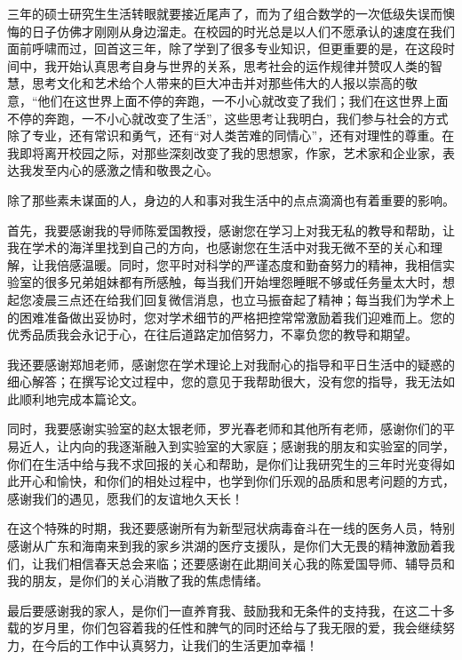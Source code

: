 
\thesisacknowledgement

三年的硕士研究生生活转眼就要接近尾声了，而为了组合数学的一次低级失误而懊悔的日子仿佛才刚刚从身边溜走。在校园的时光总是以人们不愿承认的速度在我们面前呼啸而过，回首这三年，除了学到了很多专业知识，但更重要的是，在这段时间中，我开始认真思考自身与世界的关系，思考社会的运作规律并赞叹人类的智慧，思考文化和艺术给个人带来的巨大冲击并对那些伟大的人报以崇高的敬意，“他们在这世界上面不停的奔跑，一不小心就改变了我们；我们在这世界上面不停的奔跑，一不小心就改变了生活”，这些思考让我明白，我们参与社会的方式除了专业，还有常识和勇气，还有“对人类苦难的同情心”，还有对理性的尊重。在我即将离开校园之际，对那些深刻改变了我的思想家，作家，艺术家和企业家，表达我发至内心的感激之情和敬畏之心。

除了那些素未谋面的人，身边的人和事对我生活中的点点滴滴也有着重要的影响。

首先，我要感谢我的导师陈爱国教授，感谢您在学习上对我无私的教导和帮助，让我在学术的海洋里找到自己的方向，也感谢您在生活中对我无微不至的关心和理解，让我倍感温暖。同时，您平时对科学的严谨态度和勤奋努力的精神，我相信实验室的很多兄弟姐妹都有所感触，每当我们开始埋怨睡眠不够或任务量太大时，想起您凌晨三点还在给我们回复微信消息，也立马振奋起了精神；每当我们为学术上的困难准备做出妥协时，您对学术细节的严格把控常常激励着我们迎难而上。您的优秀品质我会永记于心，在往后道路定加倍努力，不辜负您的教导和期望。

我还要感谢郑旭老师，感谢您在学术理论上对我耐心的指导和平日生活中的疑惑的细心解答；在撰写论文过程中，您的意见于我帮助很大，没有您的指导，我无法如此顺利地完成本篇论文。

同时，我要感谢实验室的赵太银老师，罗光春老师和其他所有老师，感谢你们的平易近人，让内向的我逐渐融入到实验室的大家庭；感谢我的朋友和实验室的同学，你们在生活中给与我不求回报的关心和帮助，是你们让我研究生的三年时光变得如此开心和愉快，和你们的相处过程中，也学到你们乐观的品质和思考问题的方式，感谢我们的遇见，愿我们的友谊地久天长！

在这个特殊的时期，我还要感谢所有为新型冠状病毒奋斗在一线的医务人员，特别感谢从广东和海南来到我的家乡洪湖的医疗支援队，是你们大无畏的精神激励着我们，让我们相信春天总会来临；还要感谢在此期间关心我的陈爱国导师、辅导员和我的朋友，是你们的关心消散了我的焦虑情绪。

最后要感谢我的家人，是你们一直养育我、鼓励我和无条件的支持我，在这二十多载的岁月里，你们包容着我的任性和脾气的同时还给与了我无限的爱，我会继续努力，在今后的工作中认真努力，让我们的生活更加幸福！